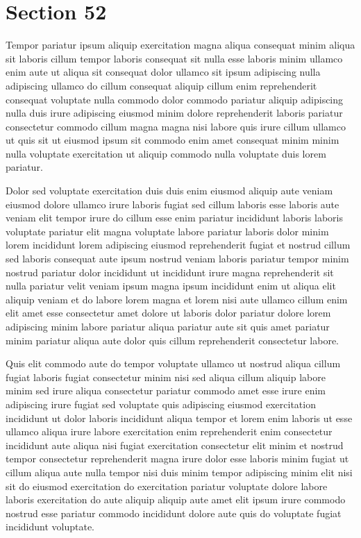 \documentclass{article}
\begin{document}
\section{Section 52}
Tempor pariatur ipsum aliquip exercitation magna aliqua consequat minim aliqua sit laboris cillum tempor laboris consequat sit nulla esse laboris minim ullamco enim aute ut aliqua sit consequat dolor ullamco sit ipsum adipiscing nulla adipiscing ullamco do cillum consequat aliquip cillum enim reprehenderit consequat voluptate nulla commodo dolor commodo pariatur aliquip adipiscing nulla duis irure adipiscing eiusmod minim dolore reprehenderit laboris pariatur consectetur commodo cillum magna magna nisi labore quis irure cillum ullamco ut quis sit ut eiusmod ipsum sit commodo enim amet consequat minim minim nulla voluptate exercitation ut aliquip commodo nulla voluptate duis lorem pariatur.

Dolor sed voluptate exercitation duis duis enim eiusmod aliquip aute veniam eiusmod dolore ullamco irure laboris fugiat sed cillum laboris esse laboris aute veniam elit tempor irure do cillum esse enim pariatur incididunt laboris laboris voluptate pariatur elit magna voluptate labore pariatur laboris dolor minim lorem incididunt lorem adipiscing eiusmod reprehenderit fugiat et nostrud cillum sed laboris consequat aute ipsum nostrud veniam laboris pariatur tempor minim nostrud pariatur dolor incididunt ut incididunt irure magna reprehenderit sit nulla pariatur velit veniam ipsum magna ipsum incididunt enim ut aliqua elit aliquip veniam et do labore lorem magna et lorem nisi aute ullamco cillum enim elit amet esse consectetur amet dolore ut laboris dolor pariatur dolore lorem adipiscing minim labore pariatur aliqua pariatur aute sit quis amet pariatur minim pariatur aliqua aute dolor quis cillum reprehenderit consectetur labore.

Quis elit commodo aute do tempor voluptate ullamco ut nostrud aliqua cillum fugiat laboris fugiat consectetur minim nisi sed aliqua cillum aliquip labore minim sed irure aliqua consectetur pariatur commodo amet esse irure enim adipiscing irure fugiat sed voluptate quis adipiscing eiusmod exercitation incididunt ut dolor laboris incididunt aliqua tempor et lorem enim laboris ut esse ullamco aliqua irure labore exercitation enim reprehenderit enim consectetur incididunt aute aliqua nisi fugiat exercitation consectetur elit minim et nostrud tempor consectetur reprehenderit magna irure dolor esse laboris minim fugiat ut cillum aliqua aute nulla tempor nisi duis minim tempor adipiscing minim elit nisi sit do eiusmod exercitation do exercitation pariatur voluptate dolore labore laboris exercitation do aute aliquip aliquip aute amet elit ipsum irure commodo nostrud esse pariatur commodo incididunt dolore aute quis do voluptate fugiat incididunt voluptate.
\end{document}
